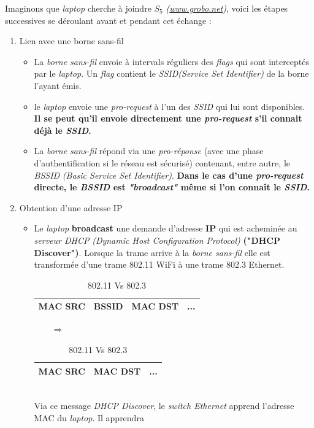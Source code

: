 \documentclass{article}
\newcommand{\titre}[1]{\textcolor{title}{#1}}
\newcommand{\term}[1]{\textit{\textcolor{maintitle}{#1}}}
\begin{document}
\begin{sffamily}
Imaginons que \textit{laptop} cherche à joindre $S_5$ \textit{(\url{www.grobo.net})}, voici les étapes successives se déroulant 
avant et pendant cet échange :
\begin{enumerate}
\item \titre{Lien avec une borne sans-fil}
\begin{itemize}
\item La \term{borne sans-fil} envoie à intervals réguliers des \term{flags} qui sont interceptés par le \textit{laptop}. Un 
\term{flag} contient le \term{SSID}\textit{(Service Set Identifier)} de la borne l'ayant émis.
\item le \textit{laptop} envoie une \term{pro-request} à l'un des \term{SSID} qui lui sont disponibles. \textbf{Il se peut qu'il 
envoie directement une \term{pro-request} s'il connait déjà le \term{SSID}.}
\item La \term{borne sans-fil} répond via une \term{pro-réponse} (avec une phase d'authentification si le réseau est sécurisé) 
contenant, entre autre, le \term{BSSID} \textit{(Basic Service Set Identifier)}. \textbf{Dans le cas d'une \term{pro-request} 
directe, le \term{BSSID} est \textit{"broadcast"} même si l'on connaît le \term{SSID}.}
\end{itemize}
\item \titre{Obtention d'une adresse IP}
\begin{itemize}
\item Le \textit{laptop} \textbf{broadcast} une demande d'adresse \textbf{IP} qui est acheminée au \term{serveur DHCP} 
\textit{(Dynamic Host Configuration Protocol)} \textbf{("DHCP Discover")}. Lorsque la trame arrive à la \term{borne sans-fil} 
elle est transformée d'une trame 802.11 WiFi à une trame 802.3 Ethernet.
\begin{table}[htpd]
\begin{center}
	\begin{tabular}{|c|c|c|c}
	\hline
	MAC SRC & BSSID & MAC DST & ...\\
	\hline
	\end{tabular}
	$\qquad\Rightarrow\qquad$
	\begin{tabular}{|c|c|c}
	\hline
	MAC SRC & MAC DST & ... \\
	\hline
	\end{tabular}
	\caption{802.11 Vs 802.3}
\end{center}
\end{table}
$ $\\Via ce message \textit{DHCP Discover}, le \term{switch Ethernet} apprend l'adresse MAC du \textit{laptop}. Il apprendra 

\end{itemize}
\end{enumerate}
\end{sffamily}
\end{document}
